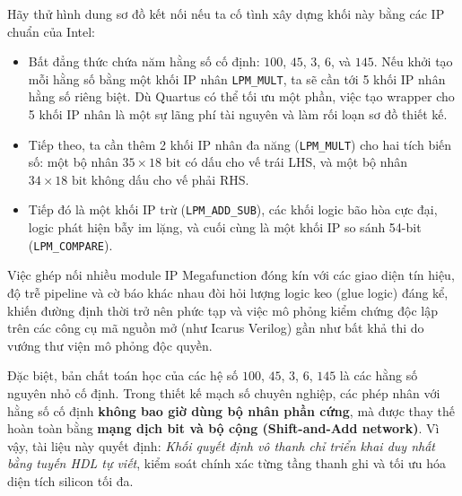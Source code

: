 Hãy thử hình dung sơ đồ kết nối nếu ta cố tình xây dựng khối này bằng các IP chuẩn của Intel:
\begin{itemize}
    \item Bất đẳng thức chứa năm hằng số cố định: $100$, $45$, $3$, $6$, và $145$. Nếu khởi tạo mỗi hằng số bằng một khối IP nhân \texttt{LPM\_MULT}, ta sẽ cần tới 5 khối IP nhân hằng số riêng biệt. Dù Quartus có thể tối ưu một phần, việc tạo wrapper cho 5 khối IP nhân là một sự lãng phí tài nguyên và làm rối loạn sơ đồ thiết kế.
    \item Tiếp theo, ta cần thêm 2 khối IP nhân đa năng (\texttt{LPM\_MULT}) cho hai tích biến số: một bộ nhân $35 \times 18\text{ bit}$ có dấu cho vế trái LHS, và một bộ nhân $34 \times 18\text{ bit}$ không dấu cho vế phải RHS.
    \item Tiếp đó là một khối IP trừ (\texttt{LPM\_ADD\_SUB}), các khối logic bão hòa cực đại, logic phát hiện bẫy im lặng, và cuối cùng là một khối IP so sánh 54-bit (\texttt{LPM\_COMPARE}).
\end{itemize}
Việc ghép nối nhiều module IP Megafunction đóng kín với các giao diện tín hiệu, độ trễ pipeline và cờ báo khác nhau đòi hỏi lượng logic keo (glue logic) đáng kể, khiến đường định thời trở nên phức tạp và việc mô phỏng kiểm chứng độc lập trên các công cụ mã nguồn mở (như Icarus Verilog) gần như bất khả thi do vướng thư viện mô phỏng độc quyền.

Đặc biệt, bản chất toán học của các hệ số $100$, $45$, $3$, $6$, $145$ là các hằng số nguyên nhỏ cố định. Trong thiết kế mạch số chuyên nghiệp, các phép nhân với hằng số cố định \textbf{không bao giờ dùng bộ nhân phần cứng}, mà được thay thế hoàn toàn bằng \textbf{mạng dịch bit và bộ cộng (Shift-and-Add network)}. Vì vậy, tài liệu này quyết định: \emph{Khối quyết định vô thanh chỉ triển khai duy nhất bằng tuyến HDL tự viết}, kiểm soát chính xác từng tầng thanh ghi và tối ưu hóa diện tích silicon tối đa.

